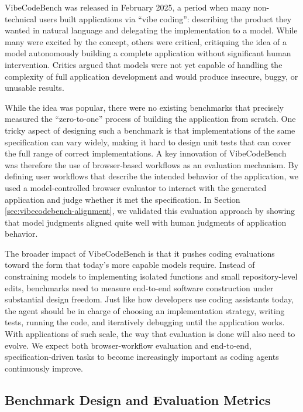 

VibeCodeBench was released in February 2025, a period when many non-technical
users built applications via ``vibe coding'': describing the product they wanted
in natural language and delegating the implementation to a model. While many
were excited by the concept, others were critical, critiquing the idea of a
model autonomously building a complete application without significant human
intervention. Critics argued that models were not yet capable of handling the
complexity of full application development and would produce insecure, buggy, or
unusable results.

While the idea was popular, there were no existing benchmarks that precisely measured
the ``zero-to-one'' process of building the application from scratch. One tricky aspect
of designing such a benchmark is that implementations of the same specification can vary
widely, making it hard to design unit tests that can cover the full range of correct implementations.
A key innovation of VibeCodeBench was therefore the use of browser-based workflows as an evaluation mechanism.
By defining user workflows that describe the intended behavior of the application, we used a
model-controlled browser evaluator to interact with the generated application and
judge whether it met the specification. In Section \ref{sec:vibecodebench-alignment}, we validated
this evaluation approach by showing that model judgments aligned quite well with human judgments of application behavior.

The broader impact of VibeCodeBench is that it pushes coding evaluations toward
the form that today's more capable models require. Instead of constraining models to
implementing isolated functions and small repository-level edits, benchmarks need to measure
end-to-end software construction under substantial design freedom. Just like how developers use
coding assistants today, the agent should be in charge of choosing an implementation strategy,
writing tests, running the code, and iteratively debugging until the application works. With applications
of such scale, the way that evaluation is done will also need to evolve. We expect both browser-workflow evaluation and
end-to-end, specification-driven tasks to become increasingly important as coding agents continuously improve.

\subsection{Benchmark Design and Evaluation Metrics}

